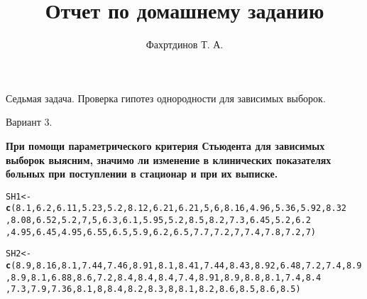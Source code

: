 \documentclass{article}\usepackage[]{graphicx}\usepackage[]{color}
\makeatletter
\newcommand{\hlnum}[1]{\textcolor[rgb]{0.686,0.059,0.569}{#1}}%
\newcommand{\hlstd}[1]{\textcolor[rgb]{0.345,0.345,0.345}{#1}}%
\newcommand{\hlkwb}[1]{\textcolor[rgb]{0.69,0.353,0.396}{#1}}%
\newcommand{\hlkwd}[1]{\textcolor[rgb]{0.737,0.353,0.396}{\textbf{#1}}}%
\newenvironment{kframe}{%
 \def\at@end@of@kframe{}%
 \ifinner\ifhmode%
  \def\at@end@of@kframe{\end{minipage}}%
  \begin{minipage}{\columnwidth}%
 \fi\fi%
 \def\FrameCommand##1{\hskip\@totalleftmargin \hskip-\fboxsep
 \colorbox{shadecolor}{##1}\hskip-\fboxsep
     \hskip-\linewidth \hskip-\@totalleftmargin \hskip\columnwidth}%
 \MakeFramed {\advance\hsize-\width
   \@totalleftmargin\z@ \linewidth\hsize
   \@setminipage}}%
 {\par\unskip\endMakeFramed%
 \at@end@of@kframe}
\newenvironment{knitrout}{}{} %
\makeatother
\begin{document}
\title{Отчет по домашнему заданию}
\pretitle{\vspace{\droptitle}\centering\huge}
\posttitle{\par}
\author{Фахртдинов Т. А.}


\maketitle
Седьмая задача. Проверка гипотез однородности для зависимых
выборок.

Вариант 3.

\textbf{При помощи параметрического критерия Стьюдента для зависимых выборок выясним, значимо ли изменение в клинических показателях больных при поступлении в стационар и при их выписке.}
\begin{knitrout}
\color{fgcolor}\begin{kframe}
\begin{alltt}
\hlstd{SH1} \hlkwb{<-} \hlkwd{c}\hlstd{(}\hlnum{8.1}\hlstd{,} \hlnum{6.2}\hlstd{,} \hlnum{6.11}\hlstd{,} \hlnum{5.23}\hlstd{,} \hlnum{5.2}\hlstd{,} \hlnum{8.12}\hlstd{,} \hlnum{6.21}\hlstd{,} \hlnum{6.21}\hlstd{,} \hlnum{5}\hlstd{,} \hlnum{6}\hlstd{,} \hlnum{8.16}\hlstd{,} \hlnum{4.96}\hlstd{,} \hlnum{5.36}\hlstd{,} \hlnum{5.92}\hlstd{,} \hlnum{8.32}
         \hlstd{,} \hlnum{8.08}\hlstd{,} \hlnum{6.52}\hlstd{,} \hlnum{5.2}\hlstd{,} \hlnum{7}\hlstd{,} \hlnum{5}\hlstd{,} \hlnum{6.3}\hlstd{,} \hlnum{6.1}\hlstd{,} \hlnum{5.95}\hlstd{,} \hlnum{5.2}\hlstd{,} \hlnum{8.5}\hlstd{,} \hlnum{8.2}\hlstd{,} \hlnum{7.3}\hlstd{,} \hlnum{6.45}\hlstd{,} \hlnum{5.2}\hlstd{,} \hlnum{6.2}
         \hlstd{,} \hlnum{4.95}\hlstd{,} \hlnum{6.45}\hlstd{,} \hlnum{4.95}\hlstd{,} \hlnum{6.55}\hlstd{,} \hlnum{6.5}\hlstd{,} \hlnum{5.9}\hlstd{,} \hlnum{6.2}\hlstd{,} \hlnum{6.5}\hlstd{,} \hlnum{7.7}\hlstd{,} \hlnum{7.2}\hlstd{,} \hlnum{7}\hlstd{,} \hlnum{7.4}\hlstd{,} \hlnum{7.8}\hlstd{,} \hlnum{7.2}\hlstd{,} \hlnum{7}\hlstd{)}

\hlstd{SH2} \hlkwb{<-} \hlkwd{c}\hlstd{(}\hlnum{8.9}\hlstd{,} \hlnum{8.16}\hlstd{,} \hlnum{8.1}\hlstd{,} \hlnum{7.44}\hlstd{,} \hlnum{7.46}\hlstd{,} \hlnum{8.91}\hlstd{,} \hlnum{8.1}\hlstd{,}\hlnum{8.41}\hlstd{,} \hlnum{7.44}\hlstd{,} \hlnum{8.43}\hlstd{,} \hlnum{8.92}\hlstd{,} \hlnum{6.48}\hlstd{,} \hlnum{7.2}\hlstd{,} \hlnum{7.4}\hlstd{,} \hlnum{8.9}
         \hlstd{,} \hlnum{8.9}\hlstd{,} \hlnum{8.1}\hlstd{,} \hlnum{6.88}\hlstd{,} \hlnum{8.6}\hlstd{,} \hlnum{7.2}\hlstd{,} \hlnum{8.4}\hlstd{,} \hlnum{8.4}\hlstd{,} \hlnum{8.4}\hlstd{,} \hlnum{7.4}\hlstd{,} \hlnum{8.91}\hlstd{,} \hlnum{8.9}\hlstd{,} \hlnum{8.8}\hlstd{,} \hlnum{8.1}\hlstd{,} \hlnum{7.4}\hlstd{,} \hlnum{8.4}
         \hlstd{,} \hlnum{7.3}\hlstd{,} \hlnum{7.9}\hlstd{,} \hlnum{7.36}\hlstd{,} \hlnum{8.1}\hlstd{,} \hlnum{8}\hlstd{,} \hlnum{8.4} \hlstd{,} \hlnum{8.2}\hlstd{,} \hlnum{8.3}\hlstd{,} \hlnum{8}\hlstd{,} \hlnum{8.1}\hlstd{,} \hlnum{8.2}\hlstd{,} \hlnum{8.6}\hlstd{,} \hlnum{8.5}\hlstd{,} \hlnum{8.6}\hlstd{,} \hlnum{8.5}\hlstd{)}


\end{alltt}
\end{kframe}
\end{knitrout}
\end{document}
